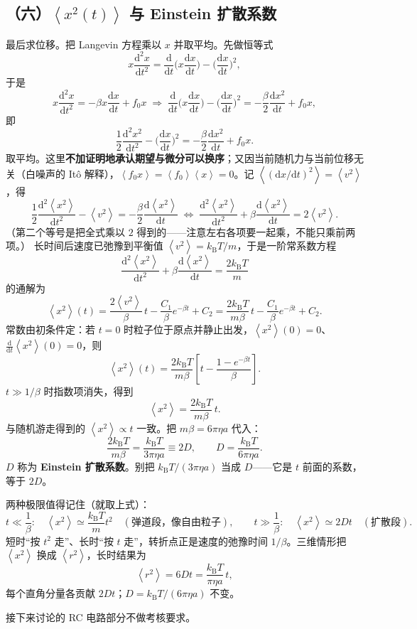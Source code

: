 \documentclass[11pt,a4paper,openany]{ctexbook}
\newcommand{\dd}{\mathrm d}
\newcommand{\avg}[1]{\left\langle #1\right\rangle}
\newcommand{\kBT}{k_{\mathrm B}T}
\begin{document}
\subsection*{（六）$\avg{x^2(t)}$ 与 Einstein 扩散系数}
最后求位移。把 Langevin 方程乘以 $x$ 并取平均。先做恒等式
\[
x\frac{\dd^2x}{\dd t^2}
=\frac{\dd}{\dd t}\Big(x\frac{\dd x}{\dd t}\Big)-\Big(\frac{\dd x}{\dd t}\Big)^2,
\]
于是
\[
x\frac{\dd^2x}{\dd t^2}=-\beta x\frac{\dd x}{\dd t}+f_0x
\;\Longrightarrow\;
\frac{\dd}{\dd t}\Big(x\frac{\dd x}{\dd t}\Big)-\Big(\frac{\dd x}{\dd t}\Big)^2
=-\frac{\beta}{2}\frac{\dd x^2}{\dd t}+f_0x,
\]
即
\[
\frac12\frac{\dd^2x^2}{\dd t^2}-\Big(\frac{\dd x}{\dd t}\Big)^2
=-\frac{\beta}{2}\frac{\dd x^2}{\dd t}+f_0x .
\]
取平均。这里\textbf{不加证明地承认期望与微分可以换序}；又因当前随机力与当前位移无关（白噪声的 Itô 解释），$\avg{f_0x}=\avg{f_0}\avg{x}=0$。记 $\avg{({\dd x}/{\dd t})^2}=\avg{v^2}$，得
\[
\frac12\frac{\dd^2\avg{x^2}}{\dd t^2}-\avg{v^2}
=-\frac{\beta}{2}\frac{\dd\avg{x^2}}{\dd t}
\;\Longleftrightarrow\;
\frac{\dd^2\avg{x^2}}{\dd t^2}
+\beta\frac{\dd\avg{x^2}}{\dd t}=2\avg{v^2}.
\]
（第二个等号是把全式乘以 $2$ 得到的——注意左右各项要一起乘，不能只乘前两项。）
长时间后速度已弛豫到平衡值 $\avg{v^2}=\kBT/m$，于是一阶常系数方程
\[
\frac{\dd^2\avg{x^2}}{\dd t^2}
+\beta\frac{\dd\avg{x^2}}{\dd t}
=\frac{2\kBT}{m}
\]
的通解为
\[
\avg{x^2}(t)
=\frac{2\avg{v^2}}{\beta}\,t-\frac{C_1}{\beta}e^{-\beta t}+C_2
=\frac{2\kBT}{m\beta}\,t-\frac{C_1}{\beta}e^{-\beta t}+C_2 .
\]
常数由初条件定：若 $t=0$ 时粒子位于原点并静止出发，$\avg{x^2}(0)=0$、$\frac{\dd}{\dd t}\avg{x^2}(0)=0$，则
\[
\avg{x^2}(t)=\frac{2\kBT}{m\beta}
\left[t-\frac{1-e^{-\beta t}}{\beta}\right].
\]
$t\gg1/\beta$ 时指数项消失，得到
\[
\avg{x^2}=\frac{2\kBT}{m\beta}\,t .
\]
与随机游走得到的 $\avg{x^2}\propto t$ 一致。把 $m\beta=6\pi\eta a$ 代入：
\[
\frac{2\kBT}{m\beta}=\frac{\kBT}{3\pi\eta a}\equiv 2D,
\qquad
\boxed{D=\frac{\kBT}{6\pi\eta a}} .
\]
$D$ 称为 \textbf{Einstein 扩散系数}。别把 $\kBT/(3\pi\eta a)$ 当成 $D$——它是 $t$ 前面的系数，等于 $2D$。
\begin{notebox}
两种极限值得记住（就取上式）：
\[
t\ll\frac1\beta:\quad
\avg{x^2}\simeq\frac{\kBT}{m}t^2
\quad(\text{弹道段，像自由粒子}),
\qquad
t\gg\frac1\beta:\quad
\avg{x^2}\simeq 2Dt
\quad(\text{扩散段}).
\]
短时“按 $t^2$ 走”、长时“按 $t$ 走”，转折点正是速度的弛豫时间 $1/\beta$。三维情形把 $\avg{x^2}$ 换成 $\avg{r^2}$，长时结果为
\[
\avg{r^2}=6Dt=\frac{\kBT}{\pi\eta a}\,t ,
\]
每个直角分量各贡献 $2Dt$；$D=\kBT/(6\pi\eta a)$ 不变。
\end{notebox}
接下来讨论的 RC 电路部分不做考核要求。
\end{document}
